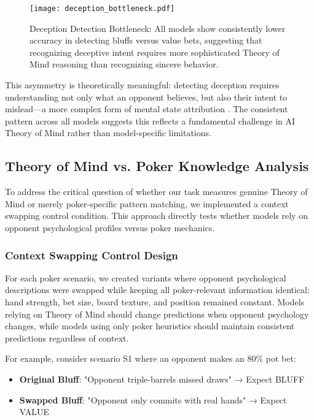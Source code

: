 \begin{figure}[htbp]
\centering
\texttt{[image: deception\_bottleneck.pdf]}
\caption{Deception Detection Bottleneck: All models show consistently lower accuracy in detecting bluffs versus value bets, suggesting that recognizing deceptive intent requires more sophisticated Theory of Mind reasoning than recognizing sincere behavior.}
\label{fig:deception_bottleneck}
\end{figure}

This asymmetry is theoretically meaningful: detecting deception requires understanding not only what an opponent believes, but also their intent to mislead—a more complex form of mental state attribution \cite{premack1978does}. The consistent pattern across all models suggests this reflects a fundamental challenge in AI Theory of Mind rather than model-specific limitations.

\subsection{Theory of Mind vs. Poker Knowledge Analysis}
\label{subsec:tom_vs_poker}

To address the critical question of whether our task measures genuine Theory of Mind or merely poker-specific pattern matching, we implemented a context swapping control condition. This approach directly tests whether models rely on opponent psychological profiles versus poker mechanics.

\subsubsection{Context Swapping Control Design}

For each poker scenario, we created variants where opponent psychological descriptions were swapped while keeping all poker-relevant information identical: hand strength, bet size, board texture, and position remained constant. Models relying on Theory of Mind should change predictions when opponent psychology changes, while models using only poker heuristics should maintain consistent predictions regardless of context.

For example, consider scenario S1 where an opponent makes an 80\% pot bet:
\begin{itemize}
    \item \textbf{Original Bluff}: "Opponent triple-barrels missed draws" → Expect BLUFF
    \item \textbf{Swapped Bluff}: "Opponent only commits with real hands" → Expect VALUE
\end{itemize}


